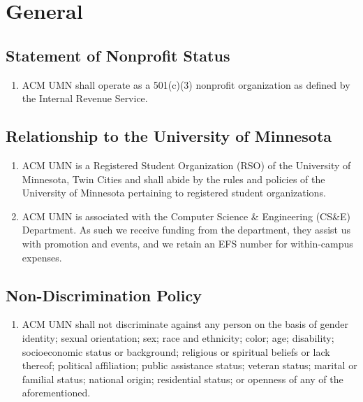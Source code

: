 





\section{General}



\subsection{Statement of Nonprofit Status}
\begin{enumerate}
	\item ACM UMN shall operate as a 501(c)(3) nonprofit organization as defined by the Internal Revenue Service.
\end{enumerate}

\subsection{Relationship to the University of Minnesota}
\begin{enumerate}
	\item ACM UMN is a Registered Student Organization (RSO) of the University of Minnesota, Twin Cities and shall abide by the rules and policies of the University of Minnesota pertaining to registered student organizations.
	\item ACM UMN is associated with the Computer Science \& Engineering (CS\&E) Department. As such we receive funding from the department, they assist us with promotion and events, and we retain an EFS number for within-campus expenses.
\end{enumerate}

\subsection{Non-Discrimination Policy}
\begin{enumerate}
	\item ACM UMN shall not discriminate against any person on the basis of gender identity; sexual orientation; sex; race and ethnicity; color; age; disability; socioeconomic status or background; religious or spiritual beliefs or lack thereof; political affiliation; public assistance status; veteran status; marital or familial status; national origin; residential status; or openness of any of the aforementioned.
\end{enumerate}

